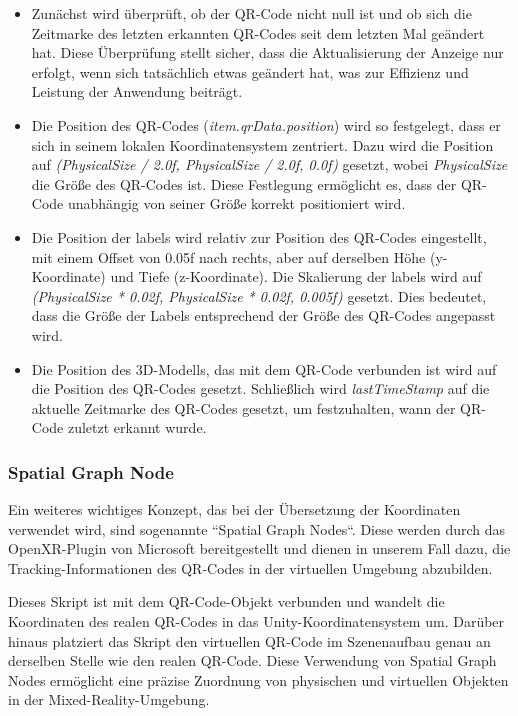 \begin{itemize}
\item Zunächst wird überprüft, ob der QR-Code nicht null ist und ob sich die Zeitmarke des letzten erkannten QR-Codes seit dem letzten Mal geändert hat. Diese Überprüfung stellt sicher, dass die Aktualisierung der Anzeige nur erfolgt, wenn sich tatsächlich etwas geändert hat, was zur Effizienz und Leistung der Anwendung beiträgt.
\item Die Position des QR-Codes (\textit{item.qrData.position}) wird so festgelegt, dass er sich in seinem lokalen Koordinatensystem zentriert. Dazu wird die Position auf \textit{(PhysicalSize / 2.0f, PhysicalSize / 2.0f, 0.0f)} gesetzt, wobei \textit{PhysicalSize} die Größe des QR-Codes ist. Diese Festlegung ermöglicht es, dass der QR-Code unabhängig von seiner Größe korrekt positioniert wird.
\item Die Position der labels wird relativ zur Position des QR-Codes eingestellt, mit einem Offset von 0.05f nach rechts, aber auf derselben Höhe (y-Koordinate) und Tiefe (z-Koordinate). Die Skalierung der labels wird auf \textit{(PhysicalSize * 0.02f, PhysicalSize * 0.02f, 0.005f)} gesetzt. Dies bedeutet, dass die Größe der Labels entsprechend der Größe des QR-Codes angepasst wird.
\item Die Position des 3D-Modells, das mit dem QR-Code verbunden ist wird auf die Position des QR-Codes gesetzt. Schließlich wird \textit{lastTimeStamp} auf die aktuelle Zeitmarke des QR-Codes gesetzt, um festzuhalten, wann der QR-Code zuletzt erkannt wurde.

\end{itemize}

\subsubsection{\label{sec:SGN} Spatial Graph Node}
Ein weiteres wichtiges Konzept, das bei der Übersetzung der Koordinaten verwendet wird, sind sogenannte ``Spatial Graph Nodes``. Diese werden durch das OpenXR-Plugin von Microsoft bereitgestellt und dienen in unserem Fall dazu, die Tracking-Informationen des QR-Codes in der virtuellen Umgebung abzubilden.

Dieses Skript ist mit dem QR-Code-Objekt verbunden und wandelt die Koordinaten des realen QR-Codes in das Unity-Koordinatensystem um. Darüber hinaus platziert das Skript den virtuellen QR-Code im Szenenaufbau genau an derselben Stelle wie den realen QR-Code. Diese Verwendung von Spatial Graph Nodes ermöglicht eine präzise Zuordnung von physischen und virtuellen Objekten in der Mixed-Reality-Umgebung.

